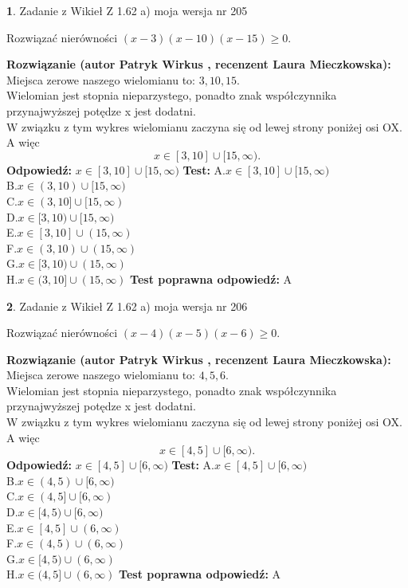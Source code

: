 \documentclass[12pt, a4paper]{article}
\theoremstyle{definition} %
\newtheorem{zad}{}
\newcommand{\zadStart}[1]{\begin{zad}#1\newline}
\newcommand{\zadStop}{\end{zad}}
\newcommand{\rozwStart}[2]{\noindent \textbf{Rozwiązanie (autor #1 , recenzent #2): }\newline}
\newcommand{\rozwStop}{\newline}
\newcommand{\odpStart}{\noindent \textbf{Odpowiedź:}\newline}
\newcommand{\odpStop}{\newline}
\newcommand{\testStart}{\noindent \textbf{Test:}\newline}
\newcommand{\testStop}{\newline}
\newcommand{\kluczStart}{\noindent \textbf{Test poprawna odpowiedź:}\newline}
\newcommand{\kluczStop}{\newline}
\begin{document}
\zadStart{Zadanie z Wikieł Z 1.62 a) moja wersja nr 205}

Rozwiązać nierówności $(x-3)(x-10)(x-15)\ge0$.
\zadStop
\rozwStart{Patryk Wirkus}{Laura Mieczkowska}
Miejsca zerowe naszego wielomianu to: $3, 10, 15$.\\
Wielomian jest stopnia nieparzystego, ponadto znak współczynnika przy\linebreak najwyższej potędze x jest dodatni.\\ W związku z tym wykres wielomianu zaczyna się od lewej strony poniżej osi OX. A więc $$x \in [3,10] \cup [15,\infty).$$
\rozwStop
\odpStart
$x \in [3,10] \cup [15,\infty)$
\odpStop
\testStart
A.$x \in [3,10] \cup [15,\infty)$\\
B.$x \in (3,10) \cup [15,\infty)$\\
C.$x \in (3,10] \cup [15,\infty)$\\
D.$x \in [3,10) \cup [15,\infty)$\\
E.$x \in [3,10] \cup (15,\infty)$\\
F.$x \in (3,10) \cup (15,\infty)$\\
G.$x \in [3,10) \cup (15,\infty)$\\
H.$x \in (3,10] \cup (15,\infty)$
\testStop
\kluczStart
A
\kluczStop



\zadStart{Zadanie z Wikieł Z 1.62 a) moja wersja nr 206}

Rozwiązać nierówności $(x-4)(x-5)(x-6)\ge0$.
\zadStop
\rozwStart{Patryk Wirkus}{Laura Mieczkowska}
Miejsca zerowe naszego wielomianu to: $4, 5, 6$.\\
Wielomian jest stopnia nieparzystego, ponadto znak współczynnika przy\linebreak najwyższej potędze x jest dodatni.\\ W związku z tym wykres wielomianu zaczyna się od lewej strony poniżej osi OX. A więc $$x \in [4,5] \cup [6,\infty).$$
\rozwStop
\odpStart
$x \in [4,5] \cup [6,\infty)$
\odpStop
\testStart
A.$x \in [4,5] \cup [6,\infty)$\\
B.$x \in (4,5) \cup [6,\infty)$\\
C.$x \in (4,5] \cup [6,\infty)$\\
D.$x \in [4,5) \cup [6,\infty)$\\
E.$x \in [4,5] \cup (6,\infty)$\\
F.$x \in (4,5) \cup (6,\infty)$\\
G.$x \in [4,5) \cup (6,\infty)$\\
H.$x \in (4,5] \cup (6,\infty)$
\testStop
\kluczStart
A
\kluczStop
\end{document}
